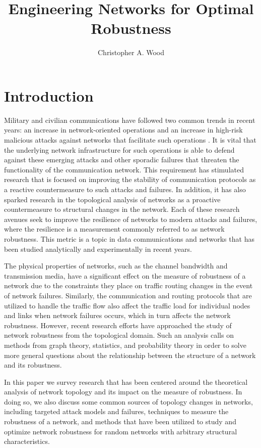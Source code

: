 \documentclass[doc]{apa}%
\title{Engineering Networks for Optimal Robustness}
\author{Christopher A. Wood}
\affiliation{Department of Computer Science \\ Rochester Institute of Technology}
\begin{document}
\maketitle   

\section{Introduction}

Military and civilian communications have followed two common trends in recent years: an increase in network-oriented operations and an increase in high-risk malicious attacks against networks that facilitate such operations \cite{Bernardnetworkrobustness}. It is vital that the underlying network infrastructure for such operations is able to defend against these emerging attacks and other sporadic failures that threaten the functionality of the communication network. This requirement has stimulated research that is focused on improving the stability of communication protocols as a reactive countermeasure to such attacks and failures. In addition, it has also sparked research in the topological analysis of networks as a proactive countermeasure to structural changes in the network. Each of these research avenues seek to improve the resilience of networks to modern attacks and failures, where the resilience is a measurement commonly referred to as network robustness. This metric is a topic in data communications and networks that has been studied analytically and experimentally in recent years.

The physical properties of networks, such as the channel bandwidth and transmission media, have a significant effect on the measure of robustness of a network due to the constraints they place on traffic routing changes in the event of network failures. Similarly, the communication and routing protocols that are utilized to handle the traffic flow also affect the traffic load for individual nodes and links when network failures occurs, which in turn affects the network robustness. However, recent research efforts have approached the study of network robustness from the topological domain. Such an analysis calls on methods from graph theory, statistics, and probability theory in order to solve more general questions about the relationship between the structure of a network and its robustness.

In this paper we survey research that has been centered around the theoretical analysis of network topology and its impact on the measure of robustness. In doing so, we also discuss some common sources of topology changes in networks, including targeted attack models and failures, techniques to measure the robustness of a network, and methods that have been utilized to study and optimize network robustness for random networks with arbitrary structural characteristics.
\end{document}
